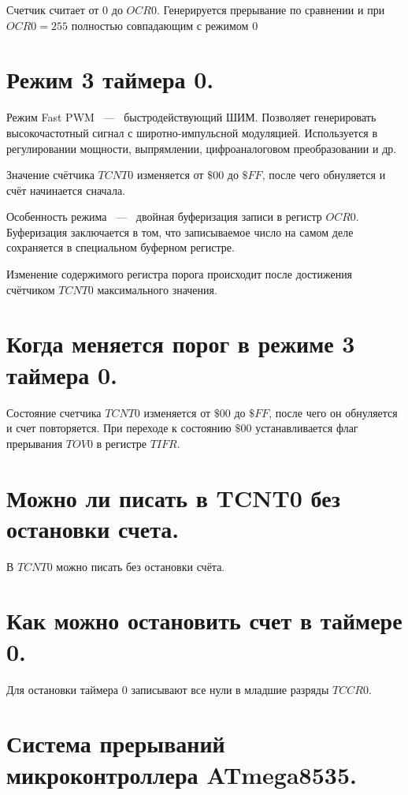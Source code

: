Счетчик считает от $0$ до $OCR0$. Генерируется прерывание по сравнении и при $OCR0 = 255$ 
полностью совпадающим с режимом $0$

\section{Режим 3 таймера 0.}
Режим Fast PWM ~---~ быстродействующий ШИМ. Позволяет генерировать
высокочастотный сигнал с широтно-импульсной модуляцией. Используется 
в регулировании мощности, выпрямлении, цифроаналоговом преобразовании и др.

Значение счётчика $TCNT0$ изменяется от $\$00$ до $\$FF$, после чего 
обнуляется и счёт начинается сначала. 


Особенность режима ~---~ двойная буферизация записи в регистр $OCR0$.
Буферизация заключается в том, что записываемое число на самом деле сохраняется в
специальном буферном регистре.

Изменение содержимого регистра порога происходит после достижения 
счётчиком $TCNT0$ максимального значения. 

\section{Когда меняется порог в режиме 3 таймера 0.}
Состояние счетчика $TCNT0$ изменяется от $\$00$ до $\$FF$, после чего он обнуляется и счет 
повторяется. При переходе к состоянию $\$00$ устанавливается флаг прерывания $TOV0$ в 
регистре $TIFR$.

\section{Можно ли писать в TCNT0 без остановки счета.}
В $TCNT0$ можно писать без остановки счёта.

\section{Как можно остановить счет в таймере 0.}
Для остановки таймера $0$ записывают все нули в младшие разряды $TCCR0$.

\section{Система прерываний микроконтроллера ATmega8535.}

